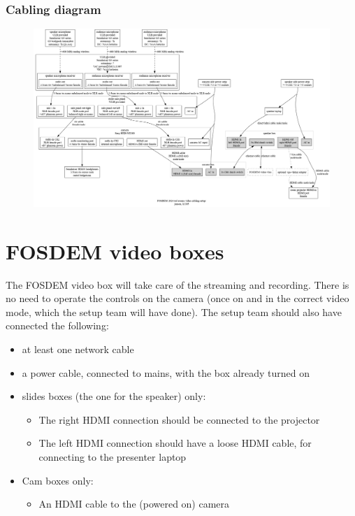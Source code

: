 \documentclass{article}
\begin{document}
\subsubsection{Cabling diagram}
\begin{figure}[H]
  \begin{sideways}
  \centering
  \includegraphics[width = 200mm]{../../graph/cabling_xxl_rooms.png}
  \end{sideways}
\end{figure}

\section{FOSDEM video boxes}
The FOSDEM video box will take care of the streaming and recording.
There is no need to operate the controls on the camera (once on and in the correct video mode, which the setup team will have done). The setup team should also have connected the following:
\begin{itemize}
  \item at least one network cable
  \item a power cable, connected to mains, with the box already turned on
  \item slides boxes (the one for the speaker) only:
    \begin{itemize}
      \item The right HDMI connection should be connected to the projector
      \item The left HDMI connection should have a loose HDMI cable, for connecting to the presenter laptop
    \end{itemize}
  \item Cam boxes only:
    \begin{itemize}
      \item An HDMI cable to the (powered on) camera
    \end{itemize}
\end{itemize}
\end{document}
